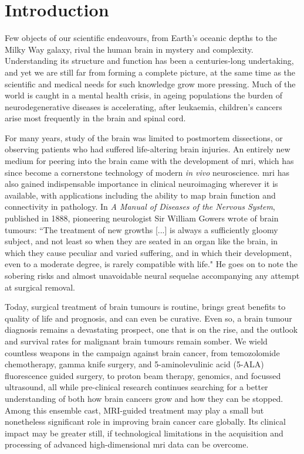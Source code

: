 \chapter*{Introduction}
\label{chapterlabel0}

Few objects of our scientific endeavours, from Earth's oceanic depths to the Milky Way galaxy, rival the human brain in mystery and complexity.
Understanding its structure and function has been a centuries-long undertaking, and yet we are still far from forming a complete picture, at the same time as the scientific and medical needs for such knowledge grow more pressing.
Much of the world is caught in a mental health crisis\autocite{Patel2018,Liu2020,Yang2021a}, in ageing populations the burden of neurodegenerative diseases is accelerating\autocite{Deuschl2020,Li2022}, after leukaemia, children's cancers arise most frequently in the brain and spinal cord\autocite{Ostrom2015}.

For many years, study of the brain was limited to postmortem dissections, or observing patients who had suffered life-altering brain injuries.
An entirely new medium for peering into the brain came with the development of \gls{mri}, which has since become a cornerstone technology of modern \textit{in vivo} neuroscience.
\Gls{mri} has also gained indispensable importance in clinical neuroimaging wherever it is available\autocite{Geethanath2019}, with applications including the ability to map brain function and connectivity in pathology.
In \textit{A Manual of Diseases of the Nervous System}, published in 1888, pioneering neurologist Sir William Gowers wrote of brain tumours:
``The treatment of new growths [...] is always a sufficiently gloomy subject, and not least so when they are seated in an organ like the brain, in which they cause peculiar and varied suffering, and in which their development, even to a moderate degree, is rarely compatible with life."\autocite{Gowers1888}
He goes on to note the sobering risks and almost unavoidable neural sequelae accompanying any attempt at surgical removal.

Today, surgical treatment of brain tumours is routine, brings great benefits to quality of life and prognosis, and can even be curative.
Even so, a brain tumour diagnosis remains a devastating prospect, one that is on the rise, and the outlook and survival rates for malignant brain tumours remain somber\autocite{Aldape2019}.
We wield countless weapons in the campaign against brain cancer, from temozolomide chemotherapy, gamma knife surgery, and 5-aminolevulinic acid (5-ALA) fluorescence guided surgery, to proton beam therapy, genomics, and focussed ultrasound, all while pre-clinical research continues searching for a better understanding of both how brain cancers grow and how they can be stopped.
Among this ensemble cast, MRI-guided treatment may play a small but nonetheless significant role in improving brain cancer care globally.
Its clinical impact may be greater still, if technological limitations in the acquisition and processing of advanced high-dimensional \gls{mri} data can be overcome.

